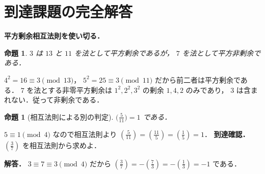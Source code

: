 \documentclass[a5paper,10pt,onecolumn]{jsarticle}
\makeatletter
\theoremstyle{mathnotetheorem}
\newtheorem{proposition}[theorem]{命題}
\renewcommand{\proofname}{証明}
\renewenvironment{proof}[1][\proofname]{%
  \par\pushQED{\qed}\normalfont\topsep4\p@\@plus2\p@\relax
  \trivlist\item[\hskip\labelsep\bfseries #1]\ignorespaces
}{\popQED\endtrivlist\@endpefalse}
\makeatother
\begin{document}
\section{到達課題の完全解答}
\noindent\textbf{平方剰余相互法則を使い切る．}
\begin{proposition}
$3$ は $13$ と $11$ を法として平方剰余であるが，
$7$ を法として平方非剰余である．
\end{proposition}
\begin{proof}
$4^2=16\equiv3\pmod{13}$，
$5^2=25\equiv3\pmod{11}$ だから前二者は平方剰余である．
$7$ を法とする非零平方剰余は
$1^2,2^2,3^2$ の剰余 $1,4,2$ のみであり，
$3$ は含まれない．従って非剰余である．
\end{proof}
\begin{proposition}[相互法則による別の判定]
$\bigl(\frac5{11}\bigr)=1$ である．
\end{proposition}
\begin{proof}
$5\equiv1\pmod4$ なので相互法則より
$\left(\frac5{11}\right)
=\left(\frac{11}5\right)=\left(\frac15\right)=1$．
\end{proof}
\noindent\textbf{到達確認．}
$\left(\frac3{7}\right)$ を相互法則から求めよ．
\par\noindent\textbf{解答．}
$3\equiv7\equiv3\pmod4$ だから
$\left(\frac3{7}\right)
=-\left(\frac73\right)
=-\left(\frac13\right)=-1$ である．
\end{document}
